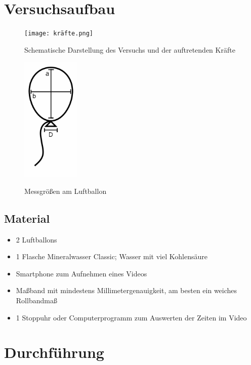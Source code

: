 \documentclass{article}
\begin{document}
    \section{Versuchsaufbau}
      \begin{figure}[ht]
          \centering
          \begin{minipage}[t]{0.4\textwidth}\label{fig:versuch_schematik}
              \texttt{[image: kräfte.png]}
              \caption{Schematische Darstellung des Versuchs und der auftretenden Kräfte}
          \end{minipage}
          \hfill
          \begin{minipage}[t]{0.4\textwidth}\label{fig:abmessungen}
              \includegraphics[height=6cm]{luftballons.png}
              \caption{Messgrößen am Luftballon}
          \end{minipage}
      \end{figure}

      \subsection{Material}
          \begin{itemize}
              \item 2 Luftballons
              \item 1 Flasche Mineralwasser Classic; Wasser mit viel Kohlensäure
              \item Smartphone zum Aufnehmen eines Videos
              \item Maßband mit mindestens Millimetergenauigkeit, am besten ein weiches Rollbandmaß
              \item 1 Stoppuhr oder Computerprogramm zum Auswerten der Zeiten im Video
          \end{itemize}

    \section{Durchführung}
\end{document}

